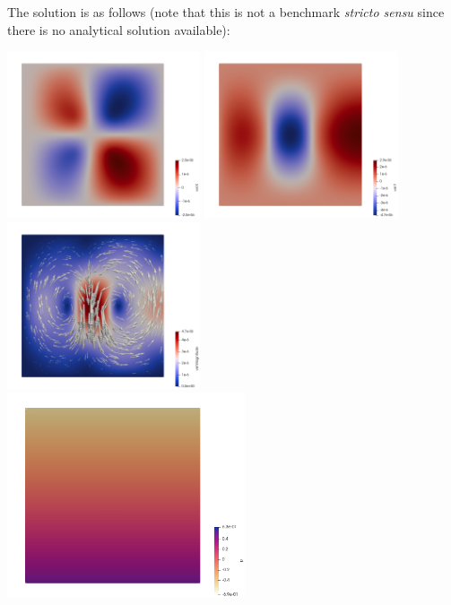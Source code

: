 The solution is as follows (note that this is not a benchmark {\it stricto sensu}
since there is no analytical solution available):

\begin{center}
\includegraphics[width=5.7cm]{python_codes/fieldstone_161/results/bench3/u}
\includegraphics[width=5.7cm]{python_codes/fieldstone_161/results/bench3/v}
\includegraphics[width=5.7cm]{python_codes/fieldstone_161/results/bench3/vel}\\
\includegraphics[width=7cm]{python_codes/fieldstone_161/results/bench3/press}

\end{center}
